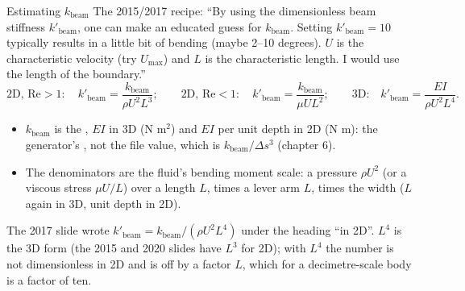 \documentclass[aspectratio=169,11pt]{beamer}
\begin{document}
\begin{frame}{Estimating $k_{\mathrm{beam}}$}
\label{fr:kbeam}
\small The 2015/2017 recipe: ``By using the dimensionless beam stiffness $k'_{\mathrm{beam}}$, one can make an educated guess for $k_{\mathrm{beam}}$. Setting $k'_{\mathrm{beam}} = 10$ typically results in a little bit of bending (maybe 2--10 degrees). $U$ is the characteristic velocity (try $U_{\max}$) and $L$ is the characteristic length. I would use the length of the boundary.''
\[
  \text{2D, } \mathrm{Re} > 1:\quad k'_{\mathrm{beam}} = \frac{k_{\mathrm{beam}}}{\rho U^2 L^3}; \qquad
  \text{2D, } \mathrm{Re} < 1:\quad k'_{\mathrm{beam}} = \frac{k_{\mathrm{beam}}}{\mu U L^2}; \qquad
  \text{3D:}\quad k'_{\mathrm{beam}} = \frac{EI}{\rho U^2 L^4}.
\]
\begin{itemize}
  \item $k_{\mathrm{beam}}$ is the , $EI$ in 3D (N m$^2$) and $EI$ per unit depth in 2D (N m): the generator's , not the file value, which is $k_{\mathrm{beam}}/\Delta s^3$ (chapter 6).
  \item The denominators are the fluid's bending moment scale: a pressure $\rho U^2$ (or a viscous stress $\mu U/L$) over a length $L$, times a lever arm $L$, times the width ($L$ again in 3D, unit depth in 2D).
\end{itemize}
\vspace{1mm}
\begin{punchbox}
\small {} The 2017 slide wrote $k'_{\mathrm{beam}} = k_{\mathrm{beam}}/(\rho U^2 L^4)$ under the heading ``in 2D''. $L^4$ is the 3D form (the 2015 and 2020 slides have $L^3$ for 2D); with $L^4$ the number is not dimensionless in 2D and is off by a factor $L$, which for a decimetre-scale body is a factor of ten.
\end{punchbox}
\end{frame}
\end{document}
